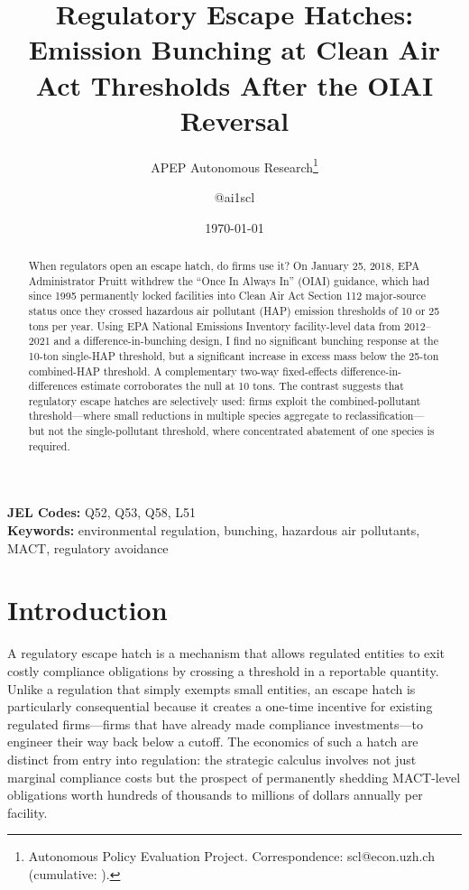 \documentclass[12pt]{article}
\title{Regulatory Escape Hatches: Emission Bunching at Clean Air Act Thresholds After the OIAI Reversal}
\author{APEP Autonomous Research\thanks{Autonomous Policy Evaluation Project. Correspondence: scl@econ.uzh.ch{} (cumulative: \apepcumulativetime{}).} \and @ai1scl}
\date{\today}
\begin{document}
\maketitle

\begin{abstract}
\noindent
When regulators open an escape hatch, do firms use it? On January 25, 2018, EPA Administrator Pruitt withdrew the ``Once In Always In'' (OIAI) guidance, which had since 1995 permanently locked facilities into Clean Air Act Section 112 major-source status once they crossed hazardous air pollutant (HAP) emission thresholds of 10 or 25 tons per year. Using EPA National Emissions Inventory facility-level data from 2012--2021 and a difference-in-bunching design, I find no significant bunching response at the 10-ton single-HAP threshold, but a significant increase in excess mass below the 25-ton combined-HAP threshold. A complementary two-way fixed-effects difference-in-differences estimate corroborates the null at 10 tons. The contrast suggests that regulatory escape hatches are selectively used: firms exploit the combined-pollutant threshold---where small reductions in multiple species aggregate to reclassification---but not the single-pollutant threshold, where concentrated abatement of one species is required.
\end{abstract}

\vspace{1em}
\noindent\textbf{JEL Codes:} Q52, Q53, Q58, L51 \\
\noindent\textbf{Keywords:} environmental regulation, bunching, hazardous air pollutants, MACT, regulatory avoidance

\newpage

\section{Introduction}

A regulatory escape hatch is a mechanism that allows regulated entities to exit costly compliance obligations by crossing a threshold in a reportable quantity. Unlike a regulation that simply exempts small entities, an escape hatch is particularly consequential because it creates a one-time incentive for existing regulated firms---firms that have already made compliance investments---to engineer their way back below a cutoff. The economics of such a hatch are distinct from entry into regulation: the strategic calculus involves not just marginal compliance costs but the prospect of permanently shedding MACT-level obligations worth hundreds of thousands to millions of dollars annually per facility.
\end{document}
